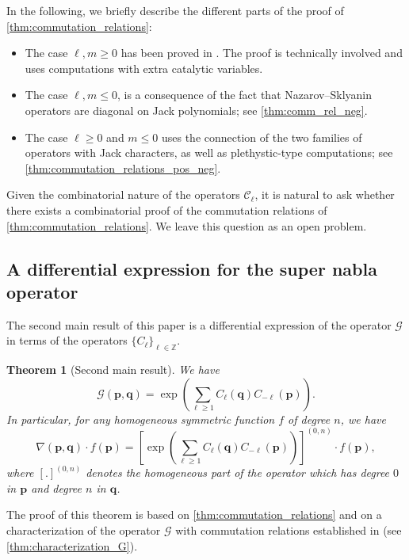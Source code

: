 \documentclass[12pt]{amsart}
\newtheorem{thm}{Theorem}[section]
\theoremstyle{remark}
\newcommand{\bfp}{\boldsymbol{p}}
\newcommand{\bfq}{\boldsymbol{q}}
\newcommand{\G}{\mathcal G}
\newcommand{\C}{\mathcal C}
\newcommand{\ZZ}{\mathbb Z}
\begin{document}
In the following, we briefly describe the different parts of the proof of \cref{thm:commutation_relations}:
\begin{itemize}
    \item The case $\ell,m\geq0$ has been proved in \cite[Theorem 6.6]{BenDaliDolega2023}. The proof is technically involved and uses computations with extra catalytic variables.
    \item The case $\ell,m\leq0$, is a consequence of the fact that Nazarov--Sklyanin operators are diagonal on Jack polynomials; see \cref{thm:comm_rel_neg}.
    \item The case $\ell\geq 0$ and $m\leq0$ uses the connection of the two families of operators with Jack characters, as well as plethystic-type computations; see \cref{thm:commutation_relations_pos_neg}.
\end{itemize}



Given the combinatorial nature of the operators $\C_\ell$, it is natural to ask whether there exists a combinatorial proof of the commutation relations of \cref{thm:commutation_relations}. We leave this question as an open problem.





\subsection{A differential expression for the super nabla operator}
The second main result of this paper is a differential expression of the operator $\G$ in terms of the operators $\{C_\ell\}_{\ell\in \ZZ}$.

\begin{thm}[Second main result]\label{thm:main_thm}
    We have
    \begin{equation}\label{eq:G_diff}
      \G(\bfp,\bfq)=\exp\left(\sum_{\ell\geq 1}C_\ell(\bfq)C_{-\ell}(\bfp)\right).  
    \end{equation}
    In particular, for any homogeneous symmetric function $f$ of degree $n$, we have
    $$\nabla(\bfp,\bfq)\cdot f(\bfp)=\left[\exp\left(\sum_{\ell\geq 1}C_\ell(\bfq)C_{-\ell}(\bfp)\right)\right]^{(0,n)}\cdot f(\bfp),$$
    where $[.]^{(0,n)}$ denotes the homogeneous part of the operator which has degree $0$ in $\bfp$ and degree $n$ in $\bfq$.
\end{thm}

The proof of this theorem is based on \cref{thm:commutation_relations} and on a characterization of the operator $\G$ with commutation relations established in \cite{BenDali2025} (see \cref{thm:characterization_G}).
\end{document}
